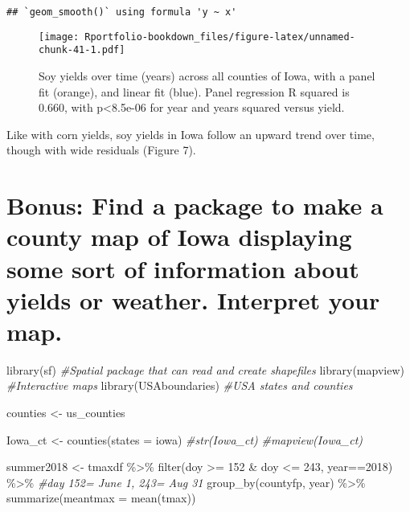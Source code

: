 \documentclass[
]{book}
\newenvironment{Shaded}{\begin{snugshade}}{\end{snugshade}}
\newcommand{\AttributeTok}[1]{\textcolor[rgb]{0.77,0.63,0.00}{#1}}
\newcommand{\CommentTok}[1]{\textcolor[rgb]{0.56,0.35,0.01}{\textit{#1}}}
\newcommand{\DecValTok}[1]{\textcolor[rgb]{0.00,0.00,0.81}{#1}}
\newcommand{\FunctionTok}[1]{\textcolor[rgb]{0.00,0.00,0.00}{#1}}
\newcommand{\NormalTok}[1]{#1}
\newcommand{\OtherTok}[1]{\textcolor[rgb]{0.56,0.35,0.01}{#1}}
\newcommand{\SpecialCharTok}[1]{\textcolor[rgb]{0.00,0.00,0.00}{#1}}
\newcommand{\StringTok}[1]{\textcolor[rgb]{0.31,0.60,0.02}{#1}}
\begin{document}
\begin{verbatim}
## `geom_smooth()` using formula 'y ~ x'
\end{verbatim}

\begin{figure}
\centering
\texttt{[image: Rportfolio-bookdown\_files/figure-latex/unnamed-chunk-41-1.pdf]}
\caption{\label{fig:unnamed-chunk-41}Soy yields over time (years) across all counties of Iowa, with a panel fit (orange), and linear fit (blue). Panel regression R squared is 0.660, with p\textless8.5e-06 for year and years squared versus yield.}
\end{figure}

Like with corn yields, soy yields in Iowa follow an upward trend over time, though with wide residuals (Figure 7).

\hypertarget{bonus-find-a-package-to-make-a-county-map-of-iowa-displaying-some-sort-of-information-about-yields-or-weather.-interpret-your-map.}{%
\section{Bonus: Find a package to make a county map of Iowa displaying some sort of information about yields or weather. Interpret your map.}\label{bonus-find-a-package-to-make-a-county-map-of-iowa-displaying-some-sort-of-information-about-yields-or-weather.-interpret-your-map.}}

\begin{Shaded}
\begin{Highlighting}[]
\FunctionTok{library}\NormalTok{(sf) }\CommentTok{\#Spatial package that can read and create shapefiles }
\FunctionTok{library}\NormalTok{(mapview) }\CommentTok{\#Interactive maps}
\FunctionTok{library}\NormalTok{(USAboundaries) }\CommentTok{\#USA states and counties}

\NormalTok{counties }\OtherTok{\textless{}{-}}\NormalTok{ us\_counties}

\NormalTok{Iowa\_ct }\OtherTok{\textless{}{-}} \FunctionTok{counties}\NormalTok{(}\AttributeTok{states =} \StringTok{\textquotesingle{}iowa\textquotesingle{}}\NormalTok{)}
\CommentTok{\#str(Iowa\_ct)}
\CommentTok{\#mapview(Iowa\_ct)}

\NormalTok{summer2018 }\OtherTok{\textless{}{-}}\NormalTok{ tmaxdf }\SpecialCharTok{\%\textgreater{}\%}
  \FunctionTok{filter}\NormalTok{(doy }\SpecialCharTok{\textgreater{}=} \DecValTok{152} \SpecialCharTok{\&}\NormalTok{ doy }\SpecialCharTok{\textless{}=} \DecValTok{243}\NormalTok{, year}\SpecialCharTok{==}\DecValTok{2018}\NormalTok{) }\SpecialCharTok{\%\textgreater{}\%} \CommentTok{\#day 152= June 1, 243= Aug 31}
  \FunctionTok{group\_by}\NormalTok{(countyfp, year) }\SpecialCharTok{\%\textgreater{}\%}
  \FunctionTok{summarize}\NormalTok{(}\AttributeTok{meantmax =} \FunctionTok{mean}\NormalTok{(tmax))}
\end{Highlighting}
\end{Shaded}
\end{document}
